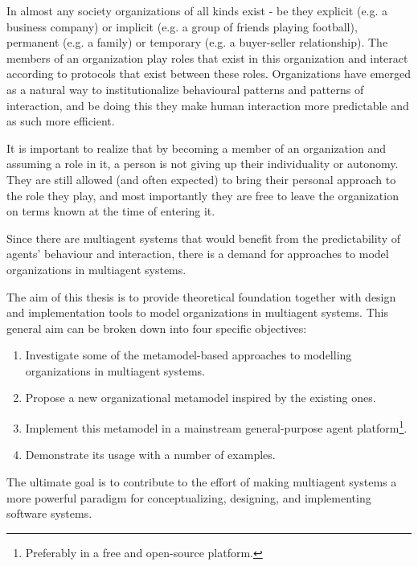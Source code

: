 In almost any society organizations of all kinds exist - be they explicit (e.g. a business company) or implicit (e.g. a group of friends playing football), permanent (e.g. a family) or temporary (e.g. a buyer-seller relationship).
The members of an organization play roles that exist in this organization and interact according to protocols that exist between these roles.
Organizations have emerged as a natural way to institutionalize behavioural patterns and patterns of interaction, and be doing this they make human interaction more predictable and as such more efficient.

It is important to realize that by becoming a member of an organization and assuming a role in it, a person is not giving up their individuality or autonomy.
They are still allowed (and often expected) to bring their personal approach to the role they play, and most importantly they are free to leave the organization on terms known at the time of entering it.

Since there are multiagent systems that would benefit from the predictability of agents' behaviour and interaction, there is a demand for approaches to model organizations in multiagent systems.


The aim of this thesis is to provide theoretical foundation together with design and implementation tools to model organizations in multiagent systems.
This general aim can be broken down into four specific objectives:
\begin{enumerate}
	\item Investigate some of the metamodel-based approaches to modelling organizations in multiagent systems.
	\item Propose a new organizational metamodel inspired by the existing ones.
	\item Implement this metamodel in a mainstream general-purpose agent platform\footnote{Preferably in a free and open-source platform.}.
	\item Demonstrate its usage with a number of examples. 
\end{enumerate}
The ultimate goal is to contribute to the effort of making multiagent systems a more powerful paradigm for conceptualizing, designing, and implementing software systems.


